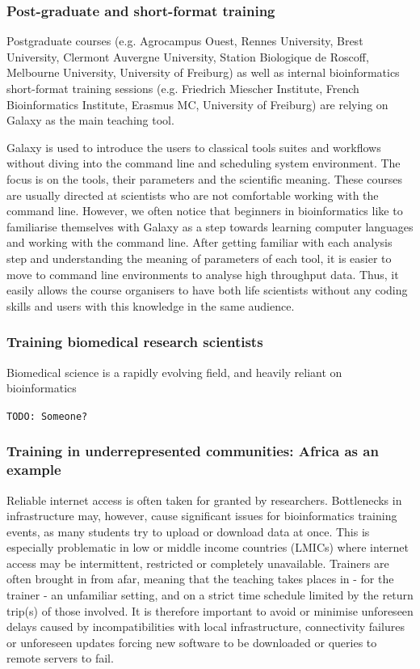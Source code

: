 \documentclass[10pt,letterpaper]{article}
\begin{document}
\subsubsection*{Post-graduate and short-format training}

Postgraduate courses (e.g. Agrocampus Ouest, Rennes University, Brest University, Clermont Auvergne University, Station Biologique de Roscoff, Melbourne University, University of Freiburg) as well as internal bioinformatics short-format training sessions (e.g. Friedrich Miescher Institute, French Bioinformatics Institute, Erasmus MC, University of Freiburg) are relying on Galaxy as the main teaching tool.

Galaxy is used to introduce the users to classical tools suites and workflows without diving into the command line and scheduling system environment. The focus is on the tools, their parameters and the scientific meaning. These courses are usually directed at scientists who are not comfortable working with the command line. However, we often notice that beginners in bioinformatics like to familiarise themselves with Galaxy as a step towards learning computer languages and working with the command line. After getting familiar with each analysis step and understanding the meaning of parameters of each tool, it is easier to move to command line environments to analyse high throughput data. Thus, it easily allows the course organisers to have both life scientists without any coding skills and users with this knowledge in the same audience.

\subsubsection*{Training biomedical research scientists}
Biomedical science is a rapidly evolving field, and heavily reliant on bioinformatics

\verb+TODO: Someone?+

\subsubsection*{Training in underrepresented communities: Africa as an example}

Reliable internet access is often taken for granted by researchers. Bottlenecks in infrastructure may, however, cause significant issues for bioinformatics training events, as many students try to upload or download data at once. This is especially problematic in low or middle income countries (LMICs) where internet access may be intermittent, restricted or completely unavailable.
Trainers are often brought in from afar, meaning that the teaching takes places in - for the trainer - an unfamiliar setting, and on a strict time schedule limited by the return trip(s) of those involved. It is therefore important to avoid or minimise unforeseen delays caused by incompatibilities with local infrastructure, connectivity failures or unforeseen updates forcing new software to be downloaded or queries to remote servers to fail.
\end{document}
